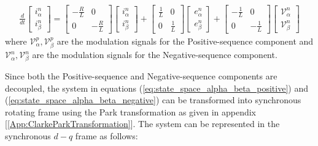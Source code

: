 \begin{equation}
    \begin{split}
        \frac{d}{dt}
        \begin{bmatrix}
            i^{n}_{\alpha} \\
            i^{n}_{\beta}
        \end{bmatrix}
        =
        \begin{bmatrix}
            -\frac{R}{L} & 0            \\
            0            & -\frac{R}{L}
        \end{bmatrix}
        \begin{bmatrix}
            i^{n}_{\alpha} \\
            i^{n}_{\beta}
        \end{bmatrix}
        +
        \begin{bmatrix}
            \frac{1}{L} & 0           \\
            0           & \frac{1}{L}
        \end{bmatrix}
        \begin{bmatrix}
            e^{n}_{\alpha} \\
            e^{n}_{\beta}
        \end{bmatrix}
        +
        \begin{bmatrix}
            -\frac{1}{L} & 0            \\
            0            & -\frac{1}{L}
        \end{bmatrix}
        \begin{bmatrix}
            \mathcal{V}^{n}_{\alpha} \\
            \mathcal{V}^{n}_{\beta}
        \end{bmatrix}
    \end{split}
    \label{eq:state_space_alpha_beta_negative}
\end{equation}
where $\mathcal{V}^{p}_{\alpha}, \mathcal{V}^{p}_{\beta}$ are the modulation signals for the Positive-sequence component
and $\mathcal{V}^{n}_{\alpha}, \mathcal{V}^{n}_{\beta}$ are the modulation signals for the Negative-sequence component.\par
Since both the Positive-sequence and Negative-sequence components are decoupled, the system in equations (\ref{eq:state_space_alpha_beta_positive})
and (\ref{eq:state_space_alpha_beta_negative}) can be transformed into synchronous rotating frame using the Park transformation as given
in appendix [\ref{App:ClarkeParkTransformation}]. The system can be represented in the synchronous $d-q$ frame as follows:
